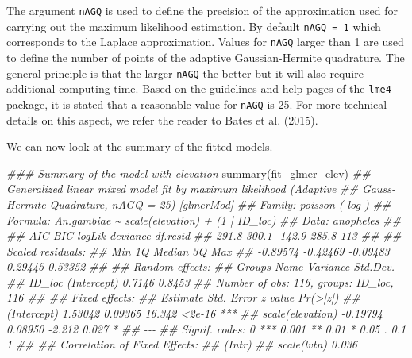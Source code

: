 \documentclass[
  letterpaper,
]{krantz}
\newenvironment{Shaded}{\begin{snugshade}}{\end{snugshade}}
\newcommand{\DocumentationTok}[1]{\textcolor[rgb]{0.37,0.37,0.37}{\textit{#1}}}
\newcommand{\FunctionTok}[1]{\textcolor[rgb]{0.28,0.35,0.67}{#1}}
\newcommand{\NormalTok}[1]{\textcolor[rgb]{0.00,0.23,0.31}{#1}}
\begin{document}
The argument \texttt{nAGQ} is used to define the precision of the
approximation used for carrying out the maximum likelihood estimation.
By default \texttt{nAGQ\ =\ 1} which corresponds to the Laplace
approximation. Values for \texttt{nAGQ} larger than 1 are used to define
the number of points of the adaptive Gaussian-Hermite quadrature. The
general principle is that the larger \texttt{nAGQ} the better but it
will also require additional computing time. Based on the guidelines and
help pages of the \texttt{lme4} package, it is stated that a reasonable
value for \texttt{nAGQ} is 25. For more technical details on this
aspect, we refer the reader to Bates et al. (2015).

We can now look at the summary of the fitted models.

\begin{Shaded}
\begin{Highlighting}[]
\DocumentationTok{\#\#\# Summary of the model with elevation}
\FunctionTok{summary}\NormalTok{(fit\_glmer\_elev)}
\DocumentationTok{\#\# Generalized linear mixed model fit by maximum likelihood (Adaptive}
\DocumentationTok{\#\#   Gauss{-}Hermite Quadrature, nAGQ = 25) [glmerMod]}
\DocumentationTok{\#\#  Family: poisson  ( log )}
\DocumentationTok{\#\# Formula: An.gambiae \textasciitilde{} scale(elevation) + (1 | ID\_loc)}
\DocumentationTok{\#\#    Data: anopheles}
\DocumentationTok{\#\# }
\DocumentationTok{\#\#      AIC      BIC   logLik deviance df.resid }
\DocumentationTok{\#\#    291.8    300.1   {-}142.9    285.8      113 }
\DocumentationTok{\#\# }
\DocumentationTok{\#\# Scaled residuals: }
\DocumentationTok{\#\#      Min       1Q   Median       3Q      Max }
\DocumentationTok{\#\# {-}0.89574 {-}0.42469 {-}0.09483  0.29445  0.53352 }
\DocumentationTok{\#\# }
\DocumentationTok{\#\# Random effects:}
\DocumentationTok{\#\#  Groups Name        Variance Std.Dev.}
\DocumentationTok{\#\#  ID\_loc (Intercept) 0.7146   0.8453  }
\DocumentationTok{\#\# Number of obs: 116, groups:  ID\_loc, 116}
\DocumentationTok{\#\# }
\DocumentationTok{\#\# Fixed effects:}
\DocumentationTok{\#\#                  Estimate Std. Error z value Pr(\textgreater{}|z|)    }
\DocumentationTok{\#\# (Intercept)       1.53042    0.09365  16.342   \textless{}2e{-}16 ***}
\DocumentationTok{\#\# scale(elevation) {-}0.19794    0.08950  {-}2.212    0.027 *  }
\DocumentationTok{\#\# {-}{-}{-}}
\DocumentationTok{\#\# Signif. codes:  0 \textquotesingle{}***\textquotesingle{} 0.001 \textquotesingle{}**\textquotesingle{} 0.01 \textquotesingle{}*\textquotesingle{} 0.05 \textquotesingle{}.\textquotesingle{} 0.1 \textquotesingle{} \textquotesingle{} 1}
\DocumentationTok{\#\# }
\DocumentationTok{\#\# Correlation of Fixed Effects:}
\DocumentationTok{\#\#             (Intr)}
\DocumentationTok{\#\# scale(lvtn) 0.036}


\end{Highlighting}
\end{Shaded}
\end{document}
